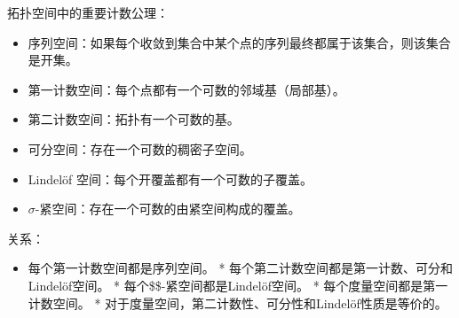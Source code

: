 拓扑空间中的重要计数公理：
\begin{itemize}
\item 序列空间：如果每个收敛到集合中某个点的序列最终都属于该集合，则该集合是开集。
\item 第一计数空间：每个点都有一个可数的邻域基（局部基）。
\item 第二计数空间：拓扑有一个可数的基。
\item 可分空间：存在一个可数的稠密子空间。
\item Lindelöf 空间：每个开覆盖都有一个可数的子覆盖。
\item $\sigma$-紧空间：存在一个可数的由紧空间构成的覆盖。
\end{itemize}
关系：

\begin{itemize}
\item 每个第一计数空间都是序列空间。
* 每个第二计数空间都是第一计数、可分和Lindelöf空间。
* 每个\$\sigma\$-紧空间都是Lindelöf空间。
* 每个度量空间都是第一计数空间。
* 对于度量空间，第二计数性、可分性和Lindelöf性质是等价的。

\end{itemize}